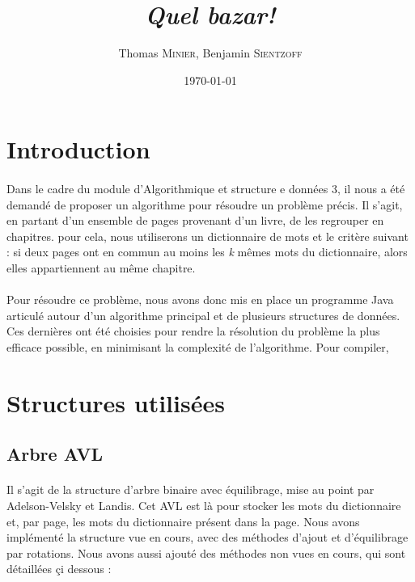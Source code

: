 \documentclass[a4paper]{article}
\title{\textit{Quel bazar!}}
\author{Thomas \textsc{Minier}, Benjamin \textsc{Sientzoff}}
\date{\today}
\begin{document}
	\maketitle
	\vspace{5cm}
	\tableofcontents
	\newpage %
	
	\section*{Introduction}

		\paragraph{}{
		Dans le cadre du module d'Algorithmique et structure e données 3, il nous a été demandé de proposer un algorithme pour résoudre un problème précis. Il s'agit, en partant d'un ensemble de pages provenant d'un livre, de les regrouper en chapitres. pour cela, nous utiliserons un dictionnaire de mots et le critère suivant : si deux pages ont en commun au moins les \textit{k} mêmes mots du dictionnaire, alors elles appartiennent au même chapitre. }
		
		\paragraph{}{Pour résoudre ce problème, nous avons donc mis en place un programme Java articulé autour d'un algorithme principal et de plusieurs structures de données. Ces dernières ont été choisies pour rendre la résolution du problème la plus efficace possible, en minimisant la complexité de l’algorithme. Pour compiler,}
		
		
	\section{Structures utilisées}
		\subsection{Arbre AVL}
		
		\paragraph{}{Il s'agit de la structure d'arbre binaire avec équilibrage, mise au point par Adelson-Velsky et Landis. Cet AVL est là pour stocker les mots du dictionnaire et, par page, les mots du dictionnaire présent dans la page. Nous avons implémenté la structure vue en cours, avec des méthodes d'ajout et d'équilibrage par rotations. Nous avons aussi ajouté des méthodes non vues en cours, qui sont détaillées çi dessous :}
		
\end{document}
